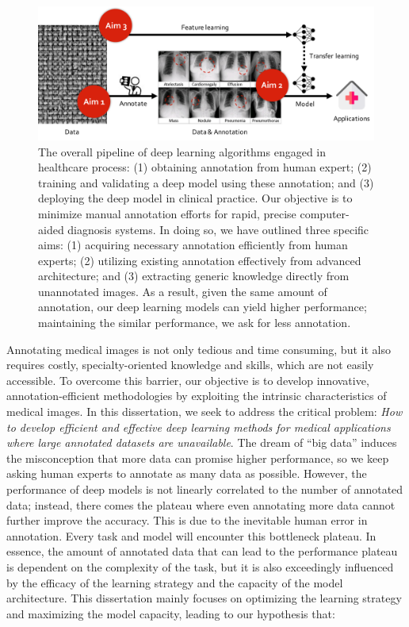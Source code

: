 \begin{figure}[t]
\begin{center}
\includegraphics[width=1.0\linewidth]{Figures/CH1/fig_hypothesis.pdf}
\end{center}
\caption[Outline of the Dissertation]
{The overall pipeline of deep learning algorithms engaged in healthcare process: (1) obtaining annotation from human expert; (2) training and validating a deep model using these annotation; and (3) deploying the deep model in clinical practice. Our objective is to minimize manual annotation efforts for rapid, precise computer-aided diagnosis systems. In doing so, we have outlined three specific aims: (1) acquiring necessary annotation efficiently from human experts; (2) utilizing existing annotation effectively from advanced architecture; and (3) extracting generic knowledge directly from unannotated images. As a result, given the same amount of annotation, our deep learning models can yield higher performance; maintaining the similar performance, we ask for less annotation.}
\label{ch1:fig:hypothesis}
\end{figure}


Annotating medical images is not only tedious and time consuming, but it also requires costly, specialty-oriented knowledge and skills, which are not easily accessible. To overcome this barrier, our objective is to develop innovative, annotation-efficient methodologies by exploiting the intrinsic characteristics of medical images. In this dissertation, we seek to address the critical problem: \textit{How to develop efficient and effective deep learning methods for medical applications where large annotated datasets are unavailable}.
The dream of ``big data'' induces the misconception that more data can promise higher performance, so we keep asking human experts to annotate as many data as possible. However, the performance of deep models is not linearly correlated to the number of annotated data; instead, there comes the plateau where even annotating more data cannot further improve the accuracy. This is due to the inevitable human error in annotation. Every task and model will encounter this bottleneck plateau. In essence, the amount of annotated data that can lead to the performance plateau is dependent on the complexity of the task, but it is also exceedingly influenced by the efficacy of the learning strategy and the capacity of the model architecture. This dissertation mainly focuses on optimizing the learning strategy and maximizing the model capacity, leading to our hypothesis that:

